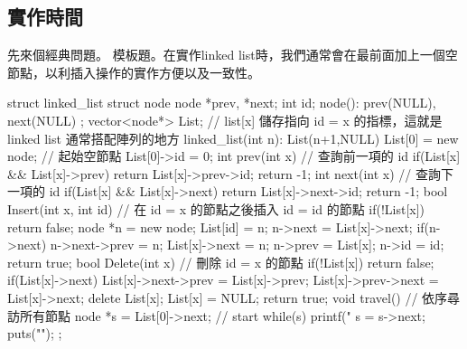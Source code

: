  \subsection{實作時間}
 先來個經典問題。
 模板題。在實作linked list時，我們通常會在最前面加上一個空節點，以利插入操作的實作方便以及一致性。
 \begin{C++}
struct linked_list {
    struct node {
        node *prev, *next;
        int id;
        node(): prev(NULL), next(NULL){}
    };
    vector<node*> List;
    // list[x] 儲存指向 id = x 的指標，這就是 linked list 通常搭配陣列的地方
    linked_list(int n): List(n+1,NULL) {
        List[0] = new node; // 起始空節點
        List[0]->id = 0;
    }
    int prev(int x){ // 查詢前一項的 id
        if(List[x] && List[x]->prev)
        	return List[x]->prev->id;
        return -1;
    }
    int next(int x){ // 查詢下一項的 id
        if(List[x] && List[x]->next)
        	return List[x]->next->id;
        return -1;
    }
    bool Insert(int x, int id) {
        // 在 id = x 的節點之後插入 id = id 的節點
        if(!List[x]) return false;
        node *n = new node;
        List[id] = n;
        n->next = List[x]->next;
        if(n->next) n->next->prev = n;
        List[x]->next = n;
        n->prev = List[x];
        n->id = id;
        return true;
    }
    bool Delete(int x){
        // 刪除 id = x 的節點
        if(!List[x]) return false;
        if(List[x]->next)
        	List[x]->next->prev = List[x]->prev;
        List[x]->prev->next = List[x]->next;
        delete List[x];
        List[x] = NULL;
        return true;
    }
    void travel(){ // 依序尋訪所有節點
        node *s = List[0]->next; // start
        while(s){
            printf("%
            s = s->next;
        }
        puts("");
    }
};
 \end{C++}
